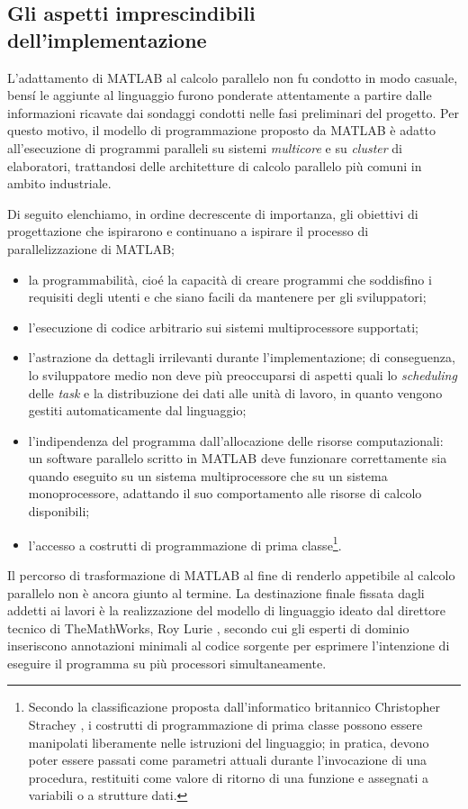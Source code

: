 \subsection{Gli aspetti imprescindibili dell'implementazione}
\label{sec2.1.2}
L'adattamento di MATLAB al calcolo parallelo non fu condotto in modo casuale, bens\'i le aggiunte al linguaggio furono ponderate attentamente a partire dalle informazioni ricavate dai sondaggi condotti nelle fasi preliminari del progetto.\newline
Per questo motivo, il modello di programmazione proposto da MATLAB \`e adatto all'esecuzione di programmi paralleli su sistemi \textit{multicore} e su \textit{cluster} di elaboratori, trattandosi delle architetture di calcolo parallelo pi\`u comuni in ambito industriale.

Di seguito elenchiamo, in ordine decrescente di importanza, gli obiettivi di progettazione che ispirarono e continuano a ispirare il processo di parallelizzazione di MATLAB;
\begin{itemize}
    \item la programmabilit\`a, cio\'e la capacit\`a di creare programmi che soddisfino i requisiti degli utenti e che siano facili da mantenere per gli sviluppatori;
    \item l'esecuzione di codice arbitrario sui sistemi multiprocessore supportati;
    \item l'astrazione da dettagli irrilevanti durante l'implementazione; di conseguenza, lo sviluppatore medio non deve pi\`u preoccuparsi di aspetti quali lo \textit{scheduling} delle \textit{task} e la distribuzione dei dati alle unit\`a di lavoro, in quanto vengono gestiti automaticamente dal linguaggio;
    \item l'indipendenza del programma dall'allocazione delle risorse computazionali: un software parallelo scritto in MATLAB deve funzionare correttamente sia quando eseguito su un sistema multiprocessore che su un sistema monoprocessore, adattando il suo comportamento alle risorse di calcolo disponibili;
    \item l'accesso a costrutti di programmazione di prima classe\footnote{Secondo la classificazione proposta dall'informatico britannico Christopher Strachey \cite{SICP96}, i costrutti di programmazione di prima classe possono essere manipolati liberamente nelle istruzioni del linguaggio; in pratica, devono poter essere passati come parametri attuali durante l'invocazione di una procedura, restituiti come valore di ritorno di una funzione e assegnati a variabili o a strutture dati.}. 
\end{itemize}
Il percorso di trasformazione di MATLAB al fine di renderlo appetibile al calcolo parallelo non \`e ancora giunto al termine. \newline La destinazione finale fissata 
dagli addetti ai lavori \`e la realizzazione del modello di linguaggio ideato dal direttore tecnico di TheMathWorks, Roy Lurie \cite{Lurie2007},
secondo cui gli esperti di dominio inseriscono annotazioni minimali al codice sorgente per esprimere l'intenzione di eseguire il programma 
su pi\`u processori simultaneamente.
